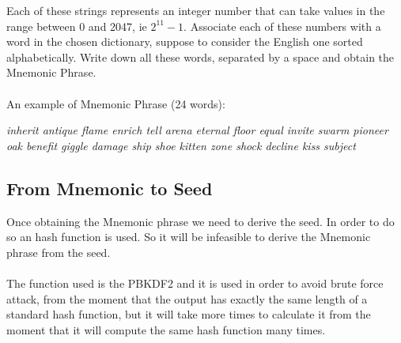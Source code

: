 Each of these strings represents an integer number that can take values in the range between 0 and 2047, ie $2^{11}-1$. Associate each of these numbers with a word in the chosen dictionary, suppose to consider the English one sorted alphabetically. Write down all these words, separated by a space and obtain the Mnemonic Phrase.
\\ \\
An example of Mnemonic Phrase (24 words):
\begin{center}
	\textit{inherit antique flame enrich tell arena eternal floor equal invite swarm pioneer oak benefit giggle damage ship shoe kitten zone shock decline kiss subject}
\end{center}


\subsection{From Mnemonic to Seed}
Once obtaining the Mnemonic phrase we need to derive the seed. In order to do so an hash function is used. So it will be infeasible to derive the Mnemonic phrase from the seed.
\\ \\
The function used is the PBKDF2 and it is used in order to avoid brute force attack, from the moment that the output has exactly the same length of a standard hash function, but it will take more times to calculate it from the moment that it will compute the same hash function many times.
\\ \\


